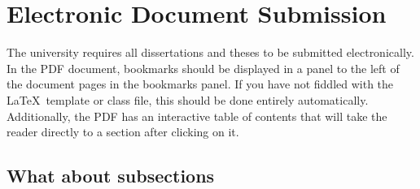 \chapter{Electronic Document Submission}

The university requires all dissertations and theses to be submitted
electronically.
In the PDF document, bookmarks should be displayed in a panel to the left of the
document pages in the  bookmarks panel.
If you have not fiddled with the \LaTeX \ template or class
file, this should be done entirely automatically. Additionally, the PDF
has an interactive table of contents that will take the reader directly to
a section after clicking on it.

\section{What about subsections}
\lipsum
